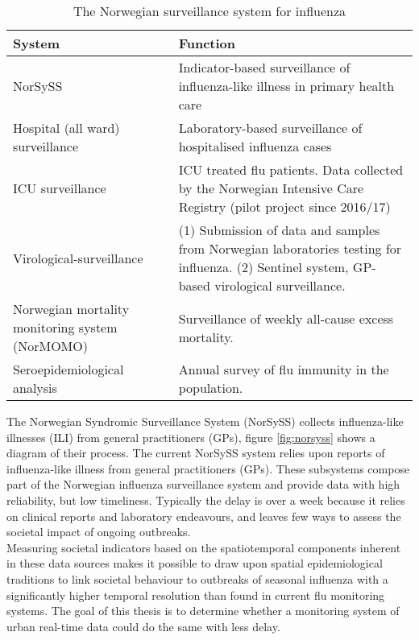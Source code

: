 \begin{table}[!htb]
\begin{tabular}{ | m{9em} | m{10.4cm}| }
 \hline
 \textbf{System} & \textbf{Function} \\ [0.5ex] 
 \hline
 NorSySS & Indicator-based surveillance of influenza-like illness in primary health care \\ 
  \hline
 Hospital (all ward) surveillance  & Laboratory-based surveillance of hospitalised influenza cases \\[1ex]
  \hline
 ICU surveillance & ICU treated flu patients. Data collected by the Norwegian Intensive Care Registry (pilot project since 2016/17) \\
  \hline
 Virological-surveillance & (1) Submission of data and samples from Norwegian laboratories testing for influenza.
(2) Sentinel system, GP-based virological surveillance. \\[1ex]
  \hline
 Norwegian mortality monitoring system (NorMOMO) & Surveillance of weekly all-cause excess mortality. \\[1ex]
 \hline
 Seroepidemiological analysis & Annual survey of flu immunity in the population. \\ [1ex] 
 \hline
\end{tabular}
\caption{The Norwegian surveillance system for influenza}
 \label{table:1}
\end{table}

The Norwegian Syndromic Surveillance System (NorSySS) collects influenza-like illnesses (ILI) from general practitioners (GPs)\cite{NorSySS}, figure \ref{fig:norsyss} shows a diagram of their process. The current NorSySS system relies upon reports of influenza-like illness from general practitioners (GPs).  These subsystems compose part of the Norwegian influenza surveillance system and provide data with high reliability, but low timeliness. Typically the delay is over a week because it relies on clinical reports and laboratory endeavours, and leaves few ways to assess the societal impact of ongoing outbreaks.\\ Measuring societal indicators based on the spatiotemporal components inherent in these data sources makes it possible to draw upon spatial epidemiological traditions to link societal behaviour to outbreaks of seasonal influenza with a significantly higher temporal resolution than found in current flu monitoring systems. The goal of this thesis is to determine whether a monitoring system of urban real-time data could do the same with less delay.

